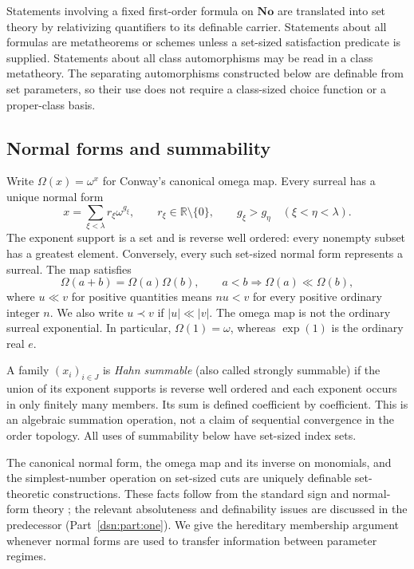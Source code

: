 \documentclass[11pt,a4paper]{article}
\numberwithin{equation}{section}
\theoremstyle{definition}
\theoremstyle{remark}
\newcommand{\No}{\mathbf{No}}
\newcommand{\R}{\mathbb R}
\begin{document}
Statements involving a fixed first-order formula on $\No$ are translated
into set theory by relativizing quantifiers to its definable carrier.
Statements about all formulas are metatheorems or schemes unless a
set-sized satisfaction predicate is supplied. Statements about all class
automorphisms may be read in a class metatheory. The separating
automorphisms constructed below are definable from set parameters, so
their use does not require a class-sized choice function or a
proper-class basis.

\subsection{Normal forms and summability}

Write $\Omega(x)=\omega^x$ for Conway's canonical omega map. Every
surreal has a unique normal form
\begin{equation}\label{dsn:rp:eq:nf}
 x=\sum_{\xi<\lambda}r_\xi\omega^{g_\xi},
 \qquad r_\xi\in\R\setminus\{0\},\qquad
 g_\xi>g_\eta\quad(\xi<\eta<\lambda).
\end{equation}
The exponent support is a set and is reverse well ordered: every
nonempty subset has a greatest element. Conversely, every such set-sized
normal form represents a surreal. The map satisfies
\[
 \Omega(a+b)=\Omega(a)\Omega(b),\qquad
 a<b\Longrightarrow\Omega(a)\ll\Omega(b),
\]
where $u\ll v$ for positive quantities means $nu<v$ for every positive
ordinary integer $n$. We also write $u\prec v$ if $|u|\ll|v|$.
The omega map is not the ordinary surreal exponential. In particular,
$\Omega(1)=\omega$, whereas $\exp(1)$ is the ordinary real $e$.

A family $(x_i)_{i\in J}$ is \emph{Hahn summable} (also called strongly
summable) if the union of its exponent supports is reverse well ordered
and each exponent occurs in only finitely many members. Its sum is
defined coefficient by coefficient. This is an algebraic summation
operation, not a claim of sequential convergence in the order topology.
All uses of summability below have set-sized index sets.

The canonical normal form, the omega map and its inverse on monomials,
and the simplest-number operation on set-sized cuts are uniquely
definable set-theoretic constructions. These facts follow from the
standard sign and normal-form theory \cite{Gonshor}; the relevant
absoluteness and definability issues are discussed in the predecessor
(Part~\ref{dsn:part:one}). We give the hereditary membership argument whenever
normal forms are used to transfer information between parameter regimes.
\end{document}
